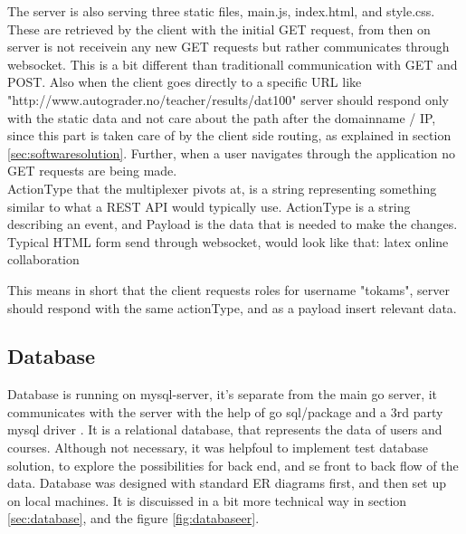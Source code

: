 The server is also serving three static files, main.js, index.html, and style.css. These are retrieved by the client with the initial GET request, from then on server is not receivein any new GET requests but rather communicates through websocket. This is a bit different than traditionall communication with GET and POST. Also when the client goes directly to a specific URL like "http://www.autograder.no/teacher/results/dat100" server should respond only with the static data and not care about the path after the domainname / IP, since this part is taken care of by the client side routing, as explained in section \ref{sec:softwaresolution}. Further, when a user navigates through the application no GET requests are being made.
\\ActionType that the multiplexer pivots at, is a string representing something similar to what a REST API would typically use. ActionType is a string describing an event, and Payload is the data that is needed to make the changes. Typical HTML form send through websocket, would look like that:
latex online collaboration

This means in short that the client requests roles for username "tokams", server should respond with the same actionType, and as a payload insert relevant data.

\subsection {Database}
Database is running on mysql-server, it's separate from the main go server, it communicates with the server with the help of go sql/package and a 3rd party mysql driver \cite{ziutek}. It is a relational database, that represents the data of users and courses. Although not necessary, it was helpfoul to implement test database solution, to explore the possibilities for back end, and se front to back flow of the data. Database was designed with standard ER diagrams first, and then set up on local machines.
It is discuissed in a bit more technical way in section \ref{sec:database}, and the figure \ref{fig:databaseer}.

